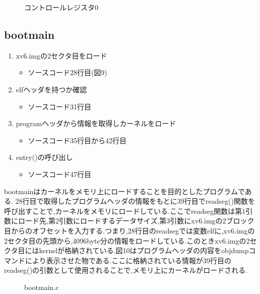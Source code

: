 \documentclass[submit,techreq,noauthor]{eco}	%
\begin{document}
\begin{figure}[H]
	\centering
	\caption{コントロールレジスタ0}
	\label{sample}
\end{figure}

\subsection{bootmain}
\begin{enumerate}
	\renewcommand{\labelenumi}{\arabic{enumi}).}
	\item xv6.imgの2セクタ目をロード
	      \begin{itemize}
		      \item ソースコード28行目(図9)
	      \end{itemize}
	\item elfヘッダを持つか確認
	      \begin{itemize}
		      \item ソースコード31行目
	      \end{itemize}
	\item programヘッダから情報を取得しカーネルをロード
	      \begin{itemize}
		      \item  ソースコード35行目から42行目
	      \end{itemize}
	\item entry()の呼び出し
	      \begin{itemize}
		      \item ソースコード47行目
	      \end{itemize}
\end{enumerate}

bootmainはカーネルをメモリ上にロードすることを目的としたプログラムである.
28行目で取得したプログラムヘッダの情報をもとに39行目でreadseg()関数を呼び出すことで,カーネルをメモリにロードしている.ここでreadseg関数は第1引数にロード先,第2引数にロードするデータサイズ,第3引数にxv6.imgの2ブロック目からのオフセットを入力する.つまり,28行目のreadsegでは変数elfに,xv6.imgの2セクタ目の先頭から,4096byte分の情報をロードしている.このときxv6.imgの2セクタ目にはkernelが格納されている.図10はプログラムヘッダの内容をobjdumpコマンドにより表示させた物である.ここに格納されている情報が39行目のreadseg()の引数として使用されることで,メモリ上にカーネルがロードされる.
\begin{figure}[H]
	\centering
	\caption{bootmain.c}
	\label{sample}
\end{figure}
\end{document}
